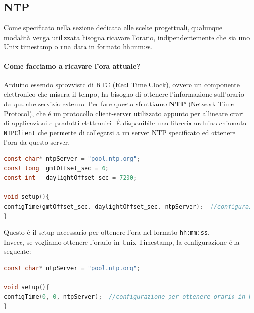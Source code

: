 \subsection{NTP}
Come specificato nella sezione dedicata alle scelte progettuali, qualunque modalità venga utilizzata bisogna ricavare l'orario,
indipendentemente che sia uno Unix timestamp o una data in formato hh:mm:ss.
\paragraph{Come facciamo a ricavare l'ora attuale?\\}
Arduino essendo sprovvisto di RTC (Real Time Clock), ovvero un componente elettronico che misura il tempo, ha bisogno di ottenere l'informazione
sull'orario da qualche servizio esterno.
Per fare questo sfruttiamo \textbf{NTP} (Network Time Protocol), che é un protocollo client-server utilizzato appunto per allineare orari di applicazioni
e prodotti elettronici.
É disponibile una libreria arduino chiamata \texttt{NTPClient} che permette di collegarsi a un server NTP specificato ed ottenere
l'ora da questo server.

\begin{lstlisting}[autogobble, style=c, language=C]
const char* ntpServer = "pool.ntp.org";
const long  gmtOffset_sec = 0;
const int   daylightOffset_sec = 7200;

void setup(){
configTime(gmtOffset_sec, daylightOffset_sec, ntpServer);  //configurazione per ottenere orario in formato hh:mm:ss con fuso orario Europeo
}
\end{lstlisting}

Questo é il setup necessario per ottenere l'ora nel formato \texttt{hh:mm:ss}.\\

Invece, se vogliamo ottenere l'orario in Unix Timestamp, la configurazione é la seguente:
\begin{lstlisting}[autogobble, style=c, language=C]
const char* ntpServer = "pool.ntp.org";

void setup(){
configTime(0, 0, ntpServer);  //configurazione per ottenere orario in Unix Timestamp
}
\end{lstlisting}

